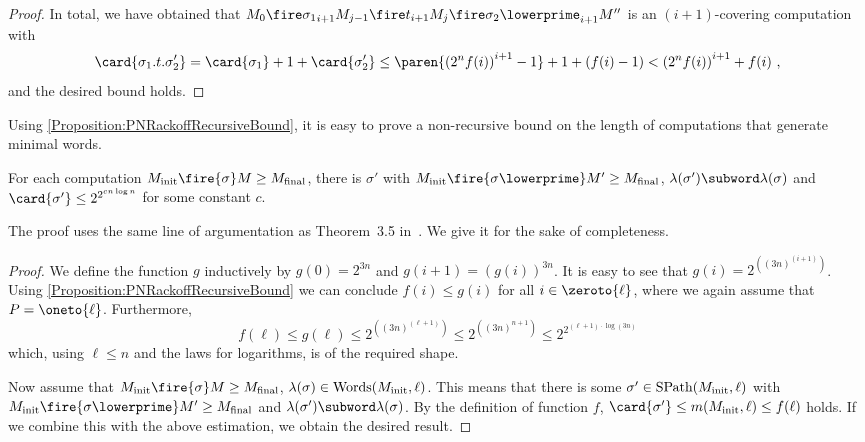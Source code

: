 \documentclass[../../diss.tex]{subfiles}
\begin{document}
\begin{proof}
    In total, we have obtained that $M_0 \fireipo{\sigma_1} M_{j-1} \fireipo{t} M_j \fireipo{\sigma_2\lowerprime} M''$ is an $(i+1)$-covering computation with
    \[
        \card{\sigma_1.t.\sigma_2'}
        = \card{\sigma_1} + 1 + \card{\sigma_2'}
        \leq \paren{ {(2^n f(i))}^{i+1} - 1 } + 1 + (f(i) - 1) <  {(2^n f(i))}^{i+1} + f(i)
        \ ,
    \]
    and the desired bound holds.
\end{proof}

Using \cref{Proposition:PNRackoffRecursiveBound}, it is easy to prove a non-recursive bound on the length of computations that generate minimal words.

\begin{proposition}%
\label{Proposition:PNRackoffNonRecursiveBound}%
  For each computation $\Minit \fire{\sigma} M \geq \Mfinal$, there is $\sigma'$ with $\Minit \fire{\sigma\lowerprime} M' \geq \Mfinal$, $\lambda(\sigma') \subword \lambda(\sigma)$ and $\card{\sigma'} \leq 2^{2^{c n \log n}}$ for some constant $c$.
\end{proposition}

The proof uses the same line of argumentation as Theorem~3.5 in~\cite{Rackoff78}.
We give it for the sake of completeness.

\begin{proof}
    We define the function $g$ inductively by $g(0) = 2^{3n}$ and $g(i + 1) = {(g(i))}^{3n}$.
    It is easy to see that $g(i) = 2^{({(3n)}^{(i+1)})}$.
    Using \cref{Proposition:PNRackoffRecursiveBound} we can conclude $f(i) \leq g(i)$ for all $i \in \zeroto{\ell}$, where we again assume that $P = \oneto{\ell}$.
    Furthermore,
    \[
      f(\ell)
      \leq g(\ell)
      \leq 2^{({(3n)}^{(\ell+1)})}
      \leq 2^{({(3n)}^{n+1})}
      \leq 2^{2^{(\ell + 1) \cdot \log (3n)}}
    \]
    which, using $\ell \leq n$ and the laws for logarithms, is of the required shape.

    Now assume that $\Minit \fire{\sigma} M \geq \Mfinal$, \ie $\lambda(\sigma) \in \text{Words}(M_{\text{init}},\ell)$.
    This means that there is some $\sigma' \in \text{SPath}(M_{\text{init}},\ell)$ with $\Minit \fire{\sigma\lowerprime} M' \geq \Mfinal$ and $\lambda(\sigma') \subword \lambda(\sigma)$.
    By the definition of function $f$, $\card{\sigma'} \leq m(\Minit,\ell) \leq f(\ell)$ holds.
    If we combine this with the above estimation, we obtain the desired result.
\end{proof}
\end{document}
